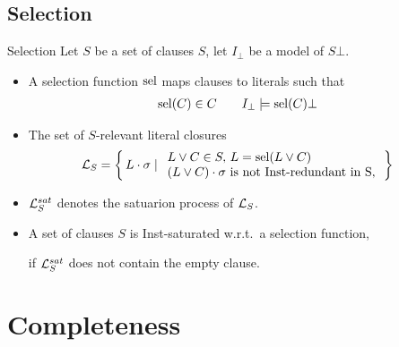 \documentclass[%
handout,
]{beamer}
\begin{document}
\subsection{Selection}
\begin{frame}{Selection}
    Let $S$ be a set of clauses $S$, let $I_\bot$ be a model of $S\bot$.

    \vspace{0.7em}
    \begin{itemize}
        \item
    A selection function $\operatorname{sel}$ maps clauses to literals such that
    \begin{align*}
        \operatorname{sel}(C)&\in C
        &&&
        I_\bot&\models\operatorname{sel}(C)\bot
    \end{align*}

    \item
    The set of $S$-relevant literal closures
    \begin{align*}
        \mathcal{L}_S &= \left\{\, L\cdot\sigma \mid
        \begin{array}{l}
            L\lor C\in S,\,L = \operatorname{sel}(L\lor C)\\
            (L\lor C)\cdot\sigma\text{ is not Inst-redundant in S},\\
        \end{array}
        \,\right\}
    \end{align*}

    \item
    $\mathcal{L}_S^{sat}$ denotes the satuarion process of $\mathcal{L}_S$.

    \item A set of clauses $S$ is Inst-saturated w.r.t.~a selection function,

    if $\mathcal{L}_S^{sat}$ does not contain the empty clause.



\end{itemize}

\end{frame}

\section{Completeness}
\end{document}
